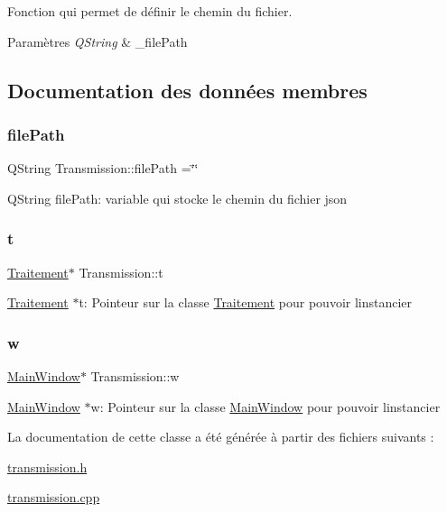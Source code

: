 Fonction qui permet de définir le chemin du fichier. 


\begin{DoxyParams}{Paramètres}
{\em Q\+String} & \+\_\+file\+Path \\
\hline
\end{DoxyParams}


\subsection{Documentation des données membres}
\mbox{\label{classTransmission_a3514cc6116b900b586f8cbf194cb39e7}} 
\subsubsection{\texorpdfstring{file\+Path}{filePath}}
{\footnotesize\ttfamily Q\+String Transmission\+::file\+Path =\char`\"{}\char`\"{}\hspace{0.3cm}{\ttfamily [private]}}

Q\+String file\+Path\+: variable qui stocke le chemin du fichier json \mbox{\label{classTransmission_ad05ceda47dcb0763e32e03e089defdb0}} 
\subsubsection{\texorpdfstring{t}{t}}
{\footnotesize\ttfamily \hyperlink{classTraitement}{Traitement}$\ast$ Transmission\+::t\hspace{0.3cm}{\ttfamily [private]}}

\hyperlink{classTraitement}{Traitement} $\ast$t\+: Pointeur sur la classe \hyperlink{classTraitement}{Traitement} pour pouvoir l\textquotesingle{}instancier \mbox{\label{classTransmission_a46ff40b83d046581408dce2027139fe0}} 
\subsubsection{\texorpdfstring{w}{w}}
{\footnotesize\ttfamily \hyperlink{classMainWindow}{Main\+Window}$\ast$ Transmission\+::w\hspace{0.3cm}{\ttfamily [private]}}

\hyperlink{classMainWindow}{Main\+Window} $\ast$w\+: Pointeur sur la classe \hyperlink{classMainWindow}{Main\+Window} pour pouvoir l\textquotesingle{}instancier 

La documentation de cette classe a été générée à partir des fichiers suivants \+:\begin{DoxyCompactItemize}
\item 
\hyperlink{transmission_8h}{transmission.\+h}\item 
\hyperlink{transmission_8cpp}{transmission.\+cpp}\end{DoxyCompactItemize}
